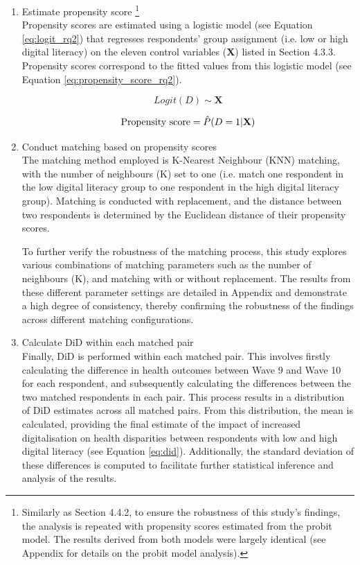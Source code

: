 \begin{enumerate}[wide=0pt, leftmargin=*, labelwidth=0pt, labelindent=\parindent, itemindent=0pt]
    \item Estimate propensity score \footnote{Similarly as Section 4.4.2, to ensure the robustness of this study's findings, the analysis is repeated with propensity scores estimated from the probit model. The results derived from both models were largely identical (see Appendix for details on the probit model analysis).} \\
    Propensity scores are estimated using a logistic model (see Equation \ref{eq:logit_rq2}) that regresses respondents' group assignment (i.e. low or high digital literacy) on the eleven control variables (\textbf{X}) listed in Section 4.3.3. Propensity scores correspond to the fitted values from this logistic model (see Equation \ref{eq:propensity_score_rq2}).

    \begin{equation}
        \label{eq:logit_rq2}
        Logit(D) \sim \textbf{X}
    \end{equation}
    
    \begin{equation}
        \label{eq:propensity_score_rq2}
        \textnormal{Propensity score} = \hat{P}(D = 1 | \textbf{X})
    \end{equation}

    \item Conduct matching based on propensity scores \\
    The matching method employed is K-Nearest Neighbour (KNN) matching, with the number of neighbours (K) set to one (i.e. match one respondent in the low digital literacy group to one respondent in the high digital literacy group). Matching is conducted with replacement, and the distance between two respondents is determined by the Euclidean distance of their propensity scores.  

    To further verify the robustness of the matching process, this study explores various combinations of matching parameters such as the number of neighbours (K), and matching with or without replacement. The results from these different parameter settings are detailed in Appendix and demonstrate a high degree of consistency, thereby confirming the robustness of the findings across different matching configurations.

    \item Calculate DiD within each matched pair \\
    Finally, DiD is performed within each matched pair. This involves firstly calculating the difference in health outcomes between Wave 9 and Wave 10 for each respondent, and subsequently calculating the differences between the two matched respondents in each pair. This process results in a distribution of DiD estimates across all matched pairs. From this distribution, the mean is calculated, providing the final estimate of the impact of increased digitalisation on health disparities between respondents with low and high digital literacy (see Equation \ref{eq:did}). Additionally, the standard deviation of these differences is computed to facilitate further statistical inference and analysis of the results.


\end{enumerate}
